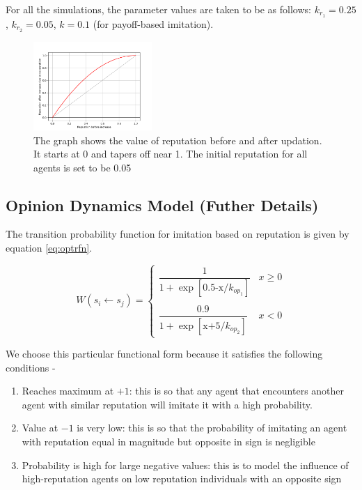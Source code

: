 \documentclass[11pt, A4 paper, twocolumn ]{article}
\begin{document}
For all the simulations, the parameter values are taken to be as follows: $ k_{r_{1}} = 0.25$, $ k_{r_{2}} = 0.05 $, $ k = 0.1  $ (for payoff-based imitation). 

\begin{figure}[h]
		\centering
		\includegraphics[width=0.4\textwidth]{graphs/reputation_inc}
	\caption{\footnotesize The graph shows the value of reputation before and after updation. It starts at 0 and tapers off near 1. The initial reputation for all agents is set to be 0.05 }
	\label{fig:repinc}
\end{figure}

 \subsection{Opinion Dynamics Model (Futher Details)}\label{app:4}
 The transition probability function for imitation based on reputation is given by equation \ref{eq:optrfn}.  
\par  

 \begin{equation} \label{eq:optrfn}
 	W(s_{i} \leftarrow s_{j}) = 
 	\begin{cases}
 		\dfrac{1}{1 + \exp[\text{0.5-x}/k_{op_{1}}]} & x\geq 0\\
 		&\\
 		\dfrac{0.9}{1 + \exp[\text{x+5}/k_{op_{2}}]} & x<0
 	\end{cases}
 \end{equation}

We choose this particular functional form because it satisfies the following conditions - 
\begin{enumerate}
	\item Reaches maximum at $ +1 $: this is so that any agent that encounters another agent with similar reputation will imitate it with a high probability.
	\item Value at $ -1 $ is very low: this is so that the probability of imitating an agent with reputation equal in magnitude but opposite in sign is negligible
	\item Probability is high for large negative values: this is to model the influence of high-reputation agents on low reputation individuals with an opposite sign
\end{enumerate}
\end{document}
